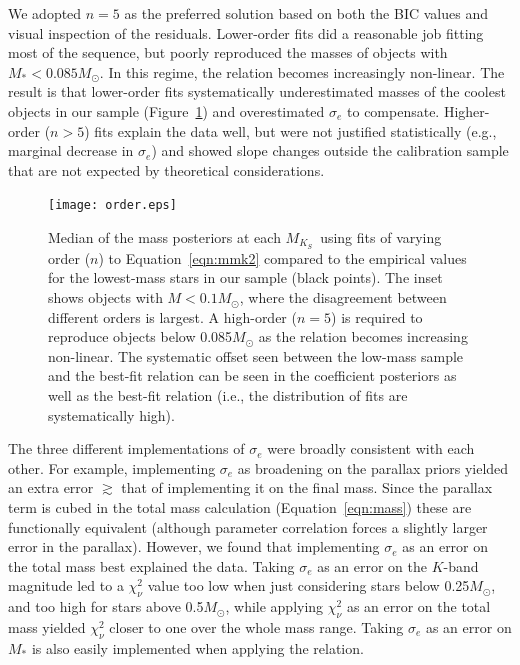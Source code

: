 \documentclass[twocolumn]{aastex62}
\newcommand{\mks}{$M_{K_S}$}
\newcommand{\order}{5}
\begin{document}
We adopted $n=\order$ as the preferred solution based on both the BIC values and visual inspection of the residuals. Lower-order fits did a reasonable job fitting most of the sequence, but poorly reproduced the masses of objects with $M_*<0.085M_\odot$. In this regime, the relation becomes increasingly non-linear. The result is that lower-order fits systematically underestimated masses of the coolest objects in our sample (Figure~\ref{fig:order}) and overestimated $\sigma_e$ to compensate. Higher-order ($n>5$) fits explain the data well, but were not justified statistically (e.g., marginal decrease in $\sigma_e$) and showed slope changes outside the calibration sample that are not expected by theoretical considerations. 

\begin{figure}[h]
\begin{center}
\texttt{[image: order.eps]}
\caption{Median of the mass posteriors at each \mks\ using fits of varying order ($n$) to Equation~\ref{eqn:mmk2} compared to the empirical values for the lowest-mass stars in our sample (black points). The inset shows objects with $M<0.1M_\odot$, where the disagreement between different orders is largest. A high-order ($n=\order$) is required to reproduce objects below 0.085$M_\odot$ as the relation becomes increasing non-linear. The systematic offset seen between the low-mass sample and the best-fit relation can be seen in the coefficient posteriors as well as the best-fit relation (i.e., the distribution of fits are systematically high). }
\label{fig:order}
\end{center}
\end{figure}

The three different implementations of $\sigma_e$ were broadly consistent with each other. For example, implementing $\sigma_e$ as broadening on the parallax priors yielded an extra error $\gtrsim$ that of implementing it on the final mass. Since the parallax term is cubed in the total mass calculation (Equation~\ref{eqn:mass}) these are functionally equivalent (although parameter correlation forces a slightly larger error in the parallax). However, we found that implementing $\sigma_e$ as an error on the total mass best explained the data. Taking $\sigma_e$ as an error on the $K$-band magnitude led to a $\chi^2_\nu$ value too low when just considering stars below 0.25$M_\odot$, and too high for stars above 0.5$M_\odot$, while applying $\chi^2_\nu$ as an error on the total mass yielded $\chi^2_\nu$ closer to one over the whole mass range. Taking $\sigma_e$ as an error on $M_*$ is also easily implemented when applying the relation. 
\end{document}
